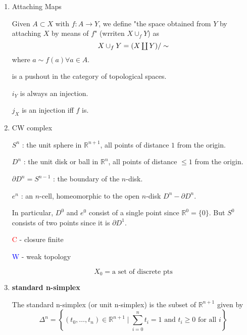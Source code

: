 \documentclass[UTF8]{ctexart}
\DeclareMathOperator{\pushout}{\mathsmaller{\coprod}}
\begin{document}
\begin{enumerate}
\item Attaching Maps\parencite{attaching_maps}

Given $A\subset X$ with $f : A\to Y$, we define "the space obtained from $Y$ by attaching $X$ by means of $f$" (wrriten $X \cup_f Y$) as
\[
X\cup_f Y = (X\pushout Y)/\sim
\]
where $a\sim f(a)\forall a\in A$.
\begin{center}
\end{center}
is a pushout in the category of topological spaces.

$i_Y$ is always an injection.

$j_X$ is an injection iff $f$ is.

\item CW complex

$S^n$ : the unit sphere in $\mathbb{R}^{n+1}$, all points of distance $1$ from the origin.

$D^n$ : the unit disk or ball in $\mathbb{R}^n$, all points of distance $\leq 1$ from the origin.

$\partial D^n = S^{n-1}$ : the boundary of the $n$-disk.

$e^n$ : an $n$-cell, homeomorphic to the open $n$-disk $D^n - {\partial D^n}$.

In particular, $D^0$ and $e^0$ consist of a single point since $\mathbb{R}^0 = \{0\}$. But $S^0$ consists of two points since it is $\partial D^1$.

\textcolor{red}{C} - closure finite

\textcolor{blue}{W} - weak topology

\[
X_0 = \text{a set of discrete pts}
\]

\begin{center}
\end{center}

\item \textbf{standard n-simplex}

The standard n-simplex (or unit n-simplex) is the subset of $\mathbb{R}^{n+1}$ given by
\[
\Delta^n = \left\{(t_0,\ldots,t_n)\in \mathbb{R}^{n+1}\mid \sum_{i=0}^{n} t_i = 1 \text{ and } t_i \geq 0 \text{ for all } i\right\}
\]


\end{enumerate}
\end{document}
